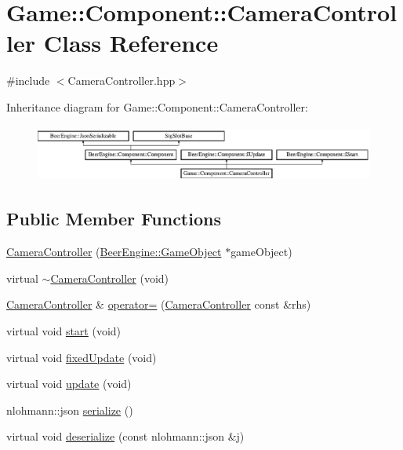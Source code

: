 \hypertarget{class_game_1_1_component_1_1_camera_controller}{}\section{Game\+:\+:Component\+:\+:Camera\+Controller Class Reference}
\label{class_game_1_1_component_1_1_camera_controller}


{\ttfamily \#include $<$Camera\+Controller.\+hpp$>$}

Inheritance diagram for Game\+:\+:Component\+:\+:Camera\+Controller\+:\begin{figure}[H]
\begin{center}
\leavevmode
\includegraphics[height=1.850220cm]{class_game_1_1_component_1_1_camera_controller}
\end{center}
\end{figure}
\subsection*{Public Member Functions}
\begin{DoxyCompactItemize}
\item 
\mbox{\hyperlink{class_game_1_1_component_1_1_camera_controller_ac9ced75e848e973c4a2f25e25059a4f7}{Camera\+Controller}} (\mbox{\hyperlink{class_beer_engine_1_1_game_object}{Beer\+Engine\+::\+Game\+Object}} $\ast$game\+Object)
\item 
virtual \mbox{\hyperlink{class_game_1_1_component_1_1_camera_controller_a6cbf885ec5705638f392a40bb762bd9c}{$\sim$\+Camera\+Controller}} (void)
\item 
\mbox{\hyperlink{class_game_1_1_component_1_1_camera_controller}{Camera\+Controller}} \& \mbox{\hyperlink{class_game_1_1_component_1_1_camera_controller_a5b4d4521b4ceeba0f98ba3663015725c}{operator=}} (\mbox{\hyperlink{class_game_1_1_component_1_1_camera_controller}{Camera\+Controller}} const \&rhs)
\item 
virtual void \mbox{\hyperlink{class_game_1_1_component_1_1_camera_controller_afe64421588babbf921d77756fa38a48b}{start}} (void)
\item 
virtual void \mbox{\hyperlink{class_game_1_1_component_1_1_camera_controller_a0bdce3356bde07f277e0c58409c1f55d}{fixed\+Update}} (void)
\item 
virtual void \mbox{\hyperlink{class_game_1_1_component_1_1_camera_controller_a675655ee2e18382203f1afa2329a1739}{update}} (void)
\item 
nlohmann\+::json \mbox{\hyperlink{class_game_1_1_component_1_1_camera_controller_a1a7f36bf3f1f25b0edd404146f0c3289}{serialize}} ()
\item 
virtual void \mbox{\hyperlink{class_game_1_1_component_1_1_camera_controller_a8076e01593ef38a83c708854906abb3b}{deserialize}} (const nlohmann\+::json \&j)
\end{DoxyCompactItemize}
